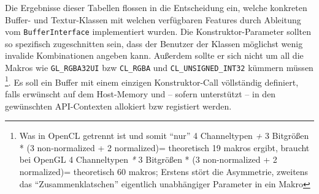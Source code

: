 	Die Ergebnisse dieser Tabellen flossen in die Entscheidung ein, welche konkreten Buffer-
	und Textur-Klassen mit welchen  verfügbaren Features durch Ableitung vom
	\lstinline|BufferInterface| implementiert wurden. Die Konstruktor-Parameter sollten
	so spezifisch zugeschnitten sein, dass der Benutzer der Klassen möglichst wenig invalide
	Kombinationen angeben kann. Außerdem sollte er sich nicht um all die Makros
	wie \lstinline|GL_RGBA32UI| bzw \lstinline|CL_RGBA| und \lstinline|CL_UNSIGNED_INT32|
	kümmern müssen 
	\footnote{Was in OpenCL getrennt ist und somit "`nur"' 
		4 Channeltypen \emph{+} 3 Bitgrößen * (3 non-normalized + 2 normalized)= theoretisch 19 makros ergibt,
		braucht bei OpenGL
			4 Channeltypen \emph{*} 3 Bitgrößen * (3 non-normalized + 2 normalized)= theoretisch 60 makros;
			Erstens stört die Asymmetrie, zweitens das "`Zusammenklatschen"' eigentlich unabhängiger Parameter in ein 
			Makro}. 
	Es soll ein Buffer mit einem einzigen Konstruktor-Call völlständig definiert,
	falls erwünscht auf dem Host-Memory und -- sofern unterstützt --
	in den gewünschten API-Contexten allokiert bzw registiert werden.
	
